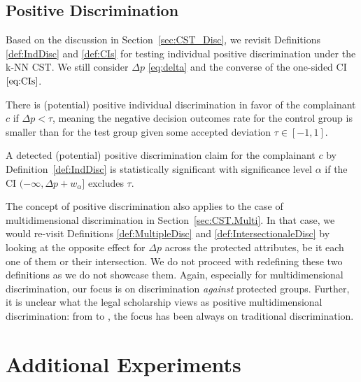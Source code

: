 \subsection{Positive Discrimination}

Based on the discussion in Section~\ref{sec:CST_Disc}, we revisit Definitions \ref{def:IndDisc} and \ref{def:CIs} for testing individual positive discrimination under the k-NN CST. We still consider $\Delta p$ \eqref{eq:delta} and the converse of the one-sided CI $\eqref{eq:CIs}$. 

%
\begin{definition}
\label{def:PostIndDisc}
    There is (potential) positive individual discrimination in favor of the complainant $c$ if $\Delta p < \tau$, meaning the negative decision outcomes rate for the control group is smaller than for the test group given some accepted deviation $\tau \in  [-1, 1]$.
\end{definition}
%

%
\begin{definition}
\label{def:PostCIs}
    A detected (potential) positive discrimination claim for the complainant $c$ by Definition~\ref{def:IndDisc}
    is statistically significant with significance level $\alpha$ if the CI $(- \infty, \Delta p + w_\alpha]$ excludes $\tau$.
\end{definition}
%

The concept of positive discrimination also applies to the case of multidimensional discrimination in Section~\ref{sec:CST.Multi}.
In that case, we would re-visit Definitions \ref{def:MultipleDisc} and \ref{def:IntersectionaleDisc} by looking at the opposite effect for $\Delta p$ across the protected attributes, be it each one of them or their intersection. 
We do not proceed with redefining these two definitions as we do not showcase them.
Again, especially for multidimensional discrimination, our focus is on discrimination \textit{against} protected groups.
Further, it is unclear what the legal scholarship views as positive multidimensional discrimination: from \textcite{Crenshaw1989_DemarginalizingTheIntersection} to \textcite{Xenidis2020_TunningEULaw}, the focus has been always on traditional discrimination.

\section{Additional Experiments}
\label{Appendix.AddExperiments}

